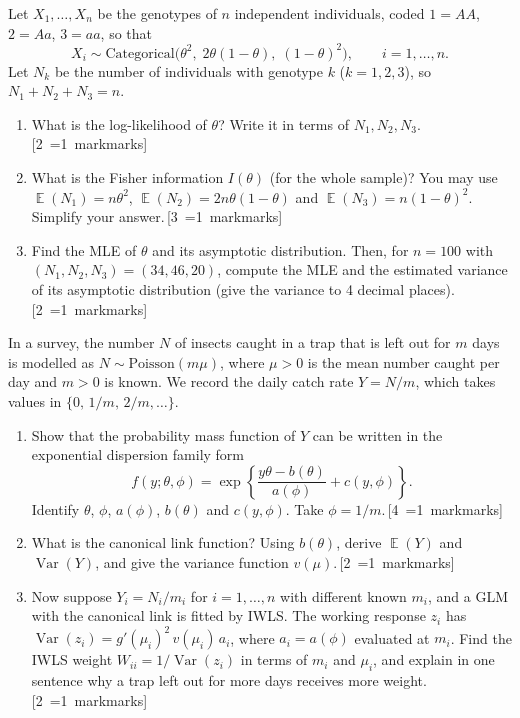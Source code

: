 \documentclass[11pt,a4paper]{article}
\newcommand{\mk}[1]{\hfill\hspace*{\fill}\mbox{\,[#1~\ifnum#1=1 mark\else marks\fi]}}
\newcommand{\ans}[1]{\par\nopagebreak[4]\vspace{2pt}\noindent\fbox{\rule{0pt}{#1}\hspace{\dimexpr\linewidth-2\fboxsep-2\fboxrule\relax}}\par\vspace{4pt}}
\newcommand{\qhead}[2]{\Needspace{10\baselineskip}\vspace{10pt}{\large\bfseries Question #1 (#2 marks)}\par\vspace{2pt}}
\DeclareMathOperator{\E}{\mathbb{E}}
\DeclareMathOperator{\Var}{Var}
\begin{document}
Let $X_1,\dots,X_n$ be the genotypes of $n$ independent individuals, coded $1=AA$, $2=Aa$, $3=aa$, so that
\[ X_i\sim\text{Categorical}\big(\theta^2,\;2\theta(1-\theta),\;(1-\theta)^2\big),\qquad i=1,\dots,n. \]
Let $N_k$ be the number of individuals with genotype $k$ ($k=1,2,3$), so $N_1+N_2+N_3=n$.

\begin{enumerate}
\item What is the log-likelihood of $\theta$? Write it in terms of $N_1,N_2,N_3$.\mk{2}
\ans{3.2cm}
\item What is the Fisher information $I(\theta)$ (for the whole sample)? You may use $\E(N_1)=n\theta^2$, $\E(N_2)=2n\theta(1-\theta)$ and $\E(N_3)=n(1-\theta)^2$. Simplify your answer.\mk{3}
\ans{5.5cm}
\item Find the MLE of $\theta$ and its asymptotic distribution. Then, for $n=100$ with $(N_1,N_2,N_3)=(34,46,20)$, compute the MLE and the estimated variance of its asymptotic distribution (give the variance to 4 decimal places).\mk{2}
\ans{6cm}
\end{enumerate}

\qhead{2}{8}
In a survey, the number $N$ of insects caught in a trap that is left out for $m$ days is modelled as $N\sim\text{Poisson}(m\mu)$, where $\mu>0$ is the mean number caught per day and $m>0$ is known. We record the daily catch rate $Y=N/m$, which takes values in $\{0,\,1/m,\,2/m,\dots\}$.

\begin{enumerate}
\item Show that the probability mass function of $Y$ can be written in the exponential dispersion family form
\[ f(y;\theta,\phi)=\exp\left\{\frac{y\theta-b(\theta)}{a(\phi)}+c(y,\phi)\right\}. \]
Identify $\theta$, $\phi$, $a(\phi)$, $b(\theta)$ and $c(y,\phi)$. Take $\phi=1/m$.\mk{4}
\ans{6cm}
\item What is the canonical link function? Using $b(\theta)$, derive $\E(Y)$ and $\Var(Y)$, and give the variance function $v(\mu)$.\mk{2}
\ans{3.4cm}
\item Now suppose $Y_i=N_i/m_i$ for $i=1,\dots,n$ with different known $m_i$, and a GLM with the canonical link is fitted by IWLS. The working response $z_i$ has $\Var(z_i)=g'(\mu_i)^2\,v(\mu_i)\,a_i$, where $a_i=a(\phi)$ evaluated at $m_i$. Find the IWLS weight $W_{ii}=1/\Var(z_i)$ in terms of $m_i$ and $\mu_i$, and explain in one sentence why a trap left out for more days receives more weight.\mk{2}
\ans{3.2cm}
\end{enumerate}
\end{document}
